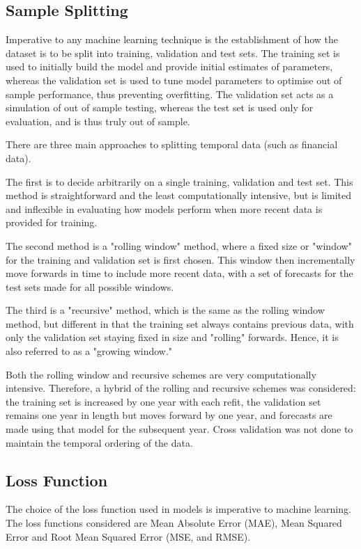 \documentclass[a4paper, table]{article}
\begin{document}
\subsection{Sample Splitting}
\label{sample_split}

Imperative to any machine learning technique is the establishment of how the dataset is to be split into training, validation and test sets. The training set is used to initially build the model and provide initial estimates of parameters, whereas the validation set is used to tune model parameters to optimise out of sample performance, thus preventing overfitting. The validation set acts as a simulation of out of sample testing, whereas the test set is used only for evaluation, and is thus truly out of sample.

There are three main approaches to splitting temporal data (such as financial data). 

The first is to decide arbitrarily on a single training, validation and test set. This method is straightforward and the least computationally intensive, but is limited and inflexible in evaluating how models perform when more recent data is provided for training. 

The second method is a "rolling window" method, where a fixed size or "window" for the training and validation set is first chosen. This window then incrementally move forwards in time to include more recent data, with a set of forecasts for the test sets made for all possible windows.

The third is a "recursive" method, which is the same as the rolling window method, but different in that the training set always contains previous data, with only the validation set staying fixed in size and "rolling" forwards. Hence, it is also referred to as a "growing window."

Both the rolling window and recursive schemes are very computationally intensive. Therefore, a hybrid of the rolling and recursive schemes was considered: the training set is increased by one year with each refit, the validation set remains one year in length but moves forward by one year, and forecasts are made using that model for the subsequent year. Cross validation was not done to maintain the temporal ordering of the data.

\subsection{Loss Function}

The choice of the loss function used in models is imperative to machine learning. The loss functions considered are Mean Absolute Error (MAE), Mean Squared Error and Root Mean Squared Error (MSE, and RMSE).
\end{document}
